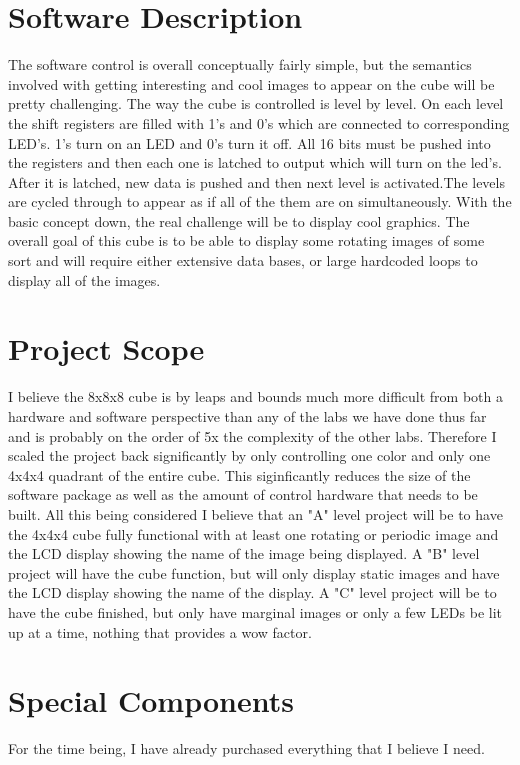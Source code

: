 \documentclass[11pt]{article} %
\begin{document}
\section{Software Description}

The software control is overall conceptually fairly simple, but the semantics involved with getting interesting and cool images to appear on the cube will be pretty challenging. The way the cube is controlled is level by level. On each level the shift registers are filled with 1's and 0's which are connected to corresponding LED's. 1's turn on an LED and 0's turn it off. All 16 bits must be pushed into the registers and then each one is latched to output which will turn on the led's. After it is latched, new data is pushed and then next level is activated.The levels are cycled through to appear as if all of the them are on simultaneously.
\newline
\newline
With the basic concept down, the real challenge will be to display cool graphics. The overall goal of this cube is to be able to display some rotating images of some sort and will require either extensive data bases, or large hardcoded loops to display all of the images.

\section{Project Scope}
I believe the 8x8x8 cube is by leaps and bounds much more difficult from both a hardware and software perspective than any of the labs we have done thus far and is probably on the order of 5x the complexity of the other labs. Therefore I scaled the project back significantly by only controlling one color and only one 4x4x4 quadrant of the entire cube. This siginficantly reduces the size of the software package as well as the amount of control hardware that needs to be built. 
\newline
\newline
All this being considered I believe that an "A" level project will be to have the 4x4x4 cube fully functional with at least one rotating or periodic image and the LCD display showing the name of the image being displayed. A "B" level project will have the cube function, but will only display static images and have the LCD display showing the name of the display. A "C" level project will be to have the cube finished, but only have marginal images or only a few LEDs be lit up at a time, nothing that provides a wow factor.
\section{Special Components}
For the time being, I have already purchased everything that I believe I need.
\end{document}
